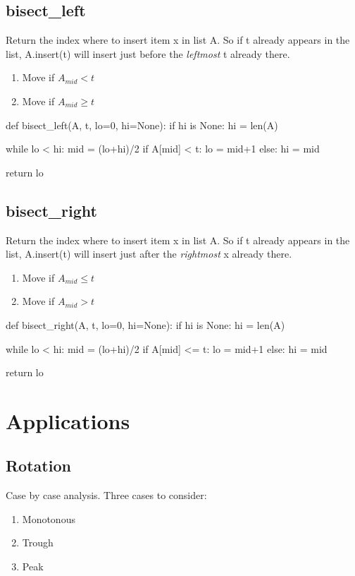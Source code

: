 \subsection{bisect\_left}
Return the index where to insert item x in list A. So if t already appears in the list,
A.insert(t) will insert just before the \textit{leftmost} t already there.
\begin{enumerate}
\item Move  if $A_{mid} < t$
\item Move  if $A_{mid} \geq t$
\end{enumerate}

\begin{python}
def bisect_left(A, t, lo=0, hi=None):
    if hi is None: hi = len(A)

    while lo < hi:
        mid = (lo+hi)/2
        if A[mid] < t: lo = mid+1   
        else:          hi = mid

    return lo
\end{python}

\subsection{bisect\_right}
Return the index where to insert item x in list A. So if t already appears in the list, A.insert(t) will insert just after the \textit{rightmost} x already there.
\begin{enumerate}
\item Move  if $A_{mid} \leq t$
\item Move  if $A_{mid} > t$
\end{enumerate}
\begin{python}
def bisect_right(A, t, lo=0, hi=None):
    if hi is None: hi = len(A)

    while lo < hi:
        mid = (lo+hi)/2
        if A[mid] <= t: lo = mid+1
        else:           hi = mid 

    return lo
\end{python}
\section{Applications}
\subsection{Rotation}
 Case by case analysis. Three cases to consider:
\begin{enumerate}
\item Monotonous 
\item Trough 
\item Peak
\end{enumerate}

